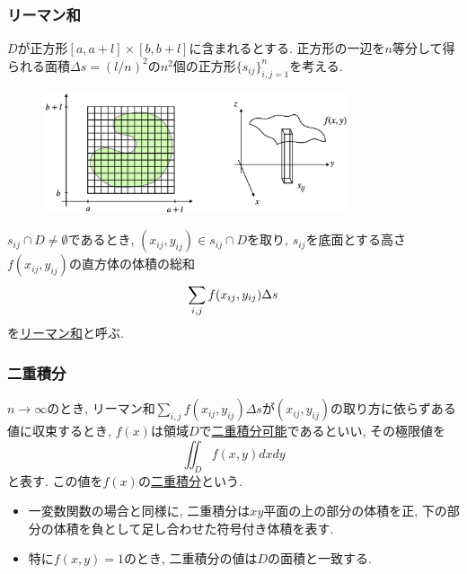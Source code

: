 \begin{frame}
\frametitle{リーマン和}

\vspace{-2mm}
$D$が正方形$[a,a+l]\times [b,b+l]$に含まれるとする. 
正方形の一辺を$n$等分して得られる面積$\Delta s=(l/n)^2$の$n^2$個の正方形$\{s_{ij}\}_{i,j=1}^n$を考える. 

\vspace{-4mm}
\begin{figure}[htbp]
 \begin{center} 
  \includegraphics[width=90mm]{calculus13/div_domain2.png}
 \end{center}
\end{figure}
\vspace{-3mm}

$s_{ij} \cap D \ne \emptyset$であるとき, $(x_{ij},y_{ij})\in s_{ij} \cap D$を取り, $s_{ij}$を底面とする高さ$f(x_{ij},y_{ij})$の直方体の体積の総和 \vspace{-1mm}
$$
\sum_{i,j }f(x_{ij},y_{ij})\Delta s \vspace{-4mm}
$$
を\underline{リーマン和}と呼ぶ. 

\end{frame}






\begin{frame}
\frametitle{二重積分}


\begin{Def}
$n \to \infty$のとき, リーマン和$\sum_{i,j }f(x_{ij},y_{ij})\Delta s$が$(x_{ij},y_{ij})$の取り方に依らずある値に収束するとき, 
$f(x)$は領域$D$で\underline{二重積分可能}であるといい, その極限値を
$$
\iint_D f(x,y)dxdy
$$
と表す. この値を$f(x)$の\underline{二重積分}という. 
\end{Def}

\begin{itemize}
\item 一変数関数の場合と同様に, 二重積分は$xy$平面の上の部分の体積を正, 下の部分の体積を負として足し合わせた符号付き体積を表す. 
\item 特に$f(x ,y)=1$のとき, 二重積分の値は$D$の面積と一致する. 
\end{itemize}

\end{frame}



